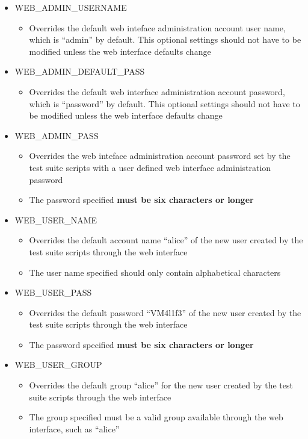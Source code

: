 \begin{itemize}
\item	WEB\_ADMIN\_USERNAME
		\begin{itemize}
		\item	Overrides the default web inteface administration account user name,
				which is ``admin'' by default. This optional settings should not 
				have to be modified unless the \cernvm web interface defaults change
		\end{itemize}
		
\item	WEB\_ADMIN\_DEFAULT\_PASS
		\begin{itemize}
		\item	Overrides the default web interface administration account password,
				which is ``password'' by default. This optional settings should not 
				have to be modified unless the \cernvm web interface defaults change
		\end{itemize}
		
\item	WEB\_ADMIN\_PASS
		\begin{itemize}
		\item	Overrides the web inteface administration account password set by
				the test suite scripts with a user defined web interface
				administration password
		\item	The password specified {\bf must be six characters or longer}
		\end{itemize}

\item	WEB\_USER\_NAME
		\begin{itemize}
		\item	Overrides the default account name ``alice'' of the new user created 
				by the test suite scripts through the web interface
		\item	The user name specified should only contain alphabetical characters
		\end{itemize}
		
\item	WEB\_USER\_PASS
		\begin{itemize}
		\item	Overrides the default password ``VM4l1f3'' of the new user created 
				by the test suite scripts through the web interface
		\item	The password specified {\bf must be six characters or longer}
		\end{itemize}

\item	WEB\_USER\_GROUP
		\begin{itemize}
		\item	Overrides the default group ``alice'' for the new user created 
				by the test suite scripts through the web interface
		\item	The group specified must be a valid group available
				through the web interface, such as ``alice''
		\end{itemize}


\end{itemize}

